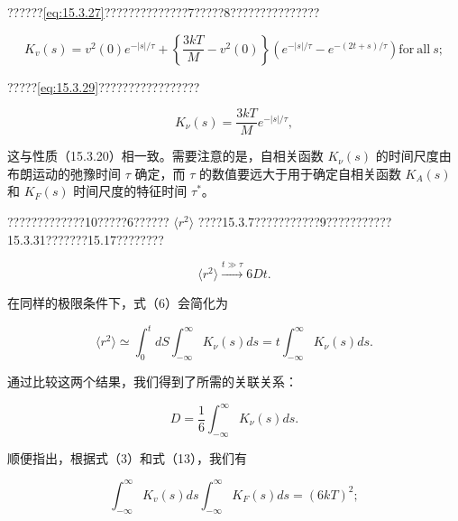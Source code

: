 ??????\autoref{eq:15.3.27}??????????????7?????8???????????????

\begin{equation}\tag{15.4.61}\label{eq:15.4.61}
K _ { v } ( s ) = v ^{2} ( 0 ) e ^{- | s | / \tau} + \left\{ \frac { 3 k T } { M } - v ^{2} ( 0 ) \right\} \left( e ^{- | s | / \tau} - e ^{- ( 2 t + s ) / \tau} \right)  \mathrm { f o r ~ a l l ~ } s ;
\end{equation}

?????\autoref{eq:15.3.29}?????????????????

\begin{equation}\tag{15.4.62}\label{eq:15.4.62}
K _ { \nu } ( s ) = \frac { 3 k T } { M } e ^{- | s | / \tau} ,
\end{equation}

这与性质（15.3.20）相一致。需要注意的是，自相关函数 \(K_{\nu}(s)\) 的时间尺度由布朗运动的弛豫时间 \(\tau\) 确定，而 \(\tau\) 的数值要远大于用于确定自相关函数 \(K_{A}(s)\) 和 \(K_{F}(s)\) 时间尺度的特征时间 \(\tau^{*}\)。

?????????????10?????6?????? \(\langle r^{2}\rangle\) ????15.3.7???????????9???????????15.3.31???????15.17????????

\begin{equation}\tag{15.4.63}\label{eq:15.4.63}
\langle r ^{2} \rangle \xrightarrow { t \gg \tau } 6 D t .
\end{equation}

在同样的极限条件下，式（6）会简化为

\begin{equation}\tag{15.4.64}\label{eq:15.4.64}
\langle r ^{2} \rangle \simeq \int _ { 0 } ^{t} d S \int _ { - \infty } ^{\infty} K _ { \nu } ( s ) d s = t \int _ { - \infty } ^{\infty} K _ { \nu } ( s ) d s .
\end{equation}

通过比较这两个结果，我们得到了所需的关联关系：

\begin{equation}\tag{15.4.65}\label{eq:15.4.65}
D = \frac { 1 } { 6 } \int _ { - \infty } ^{\infty} K _ { \nu } ( s ) d s .
\end{equation}

顺便指出，根据式（3）和式（13），我们有

\begin{equation}\tag{15.4.66}\label{eq:15.4.66}
\int _ { - \infty } ^{\infty} K _ { v } ( s ) d s \int _ { - \infty } ^{\infty} K _ { F } ( s ) d s = ( 6 k T ) ^{2} ;
\end{equation}

